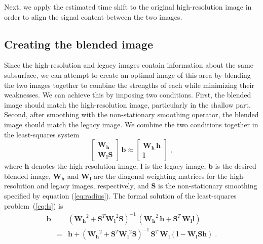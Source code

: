 
Next, we apply the estimated time shift to the original high-resolution image in order to align the signal content between the two images.


\subsection{Creating the blended image}

Since the high-resolution and legacy images contain information about the same subsurface, we can attempt to create an optimal image of this area by blending the two images together 
to combine the strengths of each while minimizing their weaknesses.
We can achieve this by imposing two conditions. First, the blended image should match the high-resolution image, particularly in the shallow part. Second, after smoothing with the non-stationary smoothing operator, the blended image should match the legacy image. We combine the two conditions together in the least-squares system
\begin{equation}
\label{eq:ls}
\left[\begin{array}{c} \mathbf{W_h} \\
        \mathbf{W_lS} \end{array}\right]\,\mathbf{b} \approx \left[\begin{array}{c} \mathbf{W_h\,h} \\
        \mathbf{l} \end{array}\right]\;,
\end{equation}
where $\mathbf{h}$ denotes the high-resolution image, $\mathbf{l}$ is the
legacy image, $\mathbf{b}$ is the desired blended image, $\mathbf{W_h}$ and $\mathbf{W_l}$
are the diagonal weighting matrices for the high-resolution and legacy images, respectively, and $\mathbf{S}$ is the non-stationary
smoothing specified by equation (\ref{eq:radius}). The formal solution of the
least-squares problem~(\ref{eq:ls}) is
\begin{eqnarray}
\nonumber
\mathbf{b} & = & \left(\mathbf{W_h}^2 + \mathbf{S}^T\mathbf{W_l}^2\mathbf{S}\right)^{-1}\,\left(\mathbf{W_h}^2\,\mathbf{h}+\mathbf{S}^T\,\mathbf{W_l}\mathbf{l}\right) \\
& = & \mathbf{h} +  \left(\mathbf{W_h}^2 + \mathbf{S}^T\mathbf{W_l}^2\mathbf{S}\right)^{-1}\,
\mathbf{S}^T\,\mathbf{W_l}\left(\mathbf{l - W_l S h}\right)\;.
\label{eq:inv}
\end{eqnarray}

